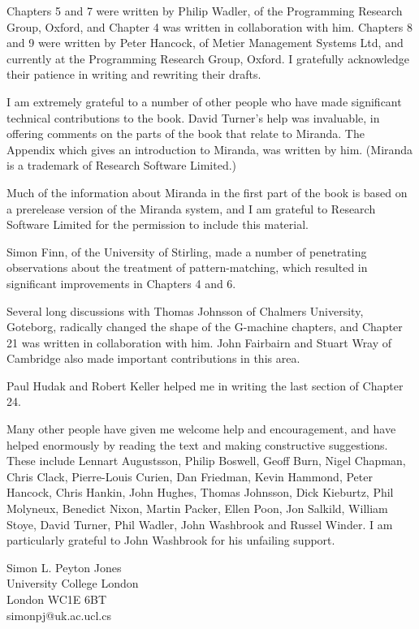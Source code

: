 Chapters 5 and 7 were written by Philip Wadler, of the Programming
Research Group, Oxford, and Chapter 4 was written in collaboration with
him. Chapters 8 and 9 were written by Peter Hancock, of Metier Management
Systems Ltd, and currently at the Programming Research Group, Oxford. I
gratefully acknowledge their patience in writing and rewriting their drafts.

I am extremely grateful to a number of other people who have made
significant technical contributions to the book. David Turner's help was
invaluable, in offering comments on the parts of the book that relate to
Miranda. The Appendix which gives an introduction to Miranda, was written
by him. (Miranda is a trademark of Research Software Limited.)

Much of the information about Miranda in the first part of the book is based
on a prerelease version of the Miranda system, and I am grateful to Research
Software Limited for the permission to include this material.

Simon Finn, of the University of Stirling, made a number of penetrating
observations about the treatment of pattern-matching, which resulted in
significant improvements in Chapters 4 and 6.

Several long discussions with Thomas Johnsson of Chalmers University,
Goteborg, radically changed the shape of the G-machine chapters, and
Chapter 21 was written in collaboration with him. John Fairbairn and Stuart
Wray of Cambridge also made important contributions in this area.

Paul Hudak and Robert Keller helped me in writing the last section of
Chapter 24.

Many other people have given me welcome help and encouragement, and
have helped enormously by reading the text and making constructive
suggestions. These include Lennart Augustsson, Philip Boswell, Geoff Burn,
Nigel Chapman, Chris Clack, Pierre-Louis Curien, Dan Friedman, Kevin
Hammond, Peter Hancock, Chris Hankin, John Hughes, Thomas Johnsson,
Dick Kieburtz, Phil Molyneux, Benedict Nixon, Martin Packer, Ellen Poon,
Jon Salkild, William Stoye, David Turner, Phil Wadler, John Washbrook and
Russel Winder. I am particularly grateful to John Washbrook for his unfailing
support.

\vspace{-\baselineskip}
\begin{flushright}
Simon L. Peyton Jones\\
University College London\\
London WC1E 6BT\\
simonpj@uk.ac.ucl.cs
\end{flushright}

